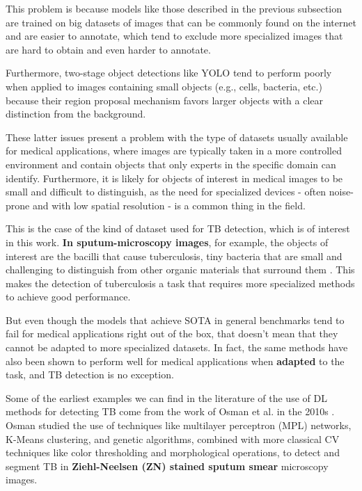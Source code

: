 \documentclass[../main.tex]{subfiles}
\begin{document}
    This problem is because models like those described in the previous subsection are trained on big datasets of images that can be commonly found on the internet and are easier to annotate, which tend to exclude more specialized images that are hard to obtain and even harder to annotate.

    Furthermore, two-stage object detections like YOLO tend to perform poorly when applied to images containing small objects (e.g., cells, bacteria, etc.)  because their region proposal mechanism favors larger objects with a clear distinction from the background. 

    These latter issues present a problem with the type of datasets usually available for medical applications, where images are typically taken in a more controlled environment and contain objects that only experts in the specific domain can identify. Furthermore, it is likely for objects of interest in medical images to be small and difficult to distinguish, as the need for specialized devices - often noise-prone and with low spatial resolution - is a common thing in the field.

    This is the case of the kind of dataset used for TB detection, which is of interest in this work. \textbf{In sputum-microscopy images}, for example, the objects of interest are the bacilli that cause tuberculosis, tiny bacteria that are small and challenging to distinguish from other organic materials that surround them \cite{osman_tuberculosis_2011}. This makes the detection of tuberculosis a task that requires more specialized methods to achieve good performance.

    But even though the models that achieve SOTA in general benchmarks tend to fail for medical applications right out of the box, that doesn't mean that they cannot be adapted to more specialized datasets. In fact, the same methods have also been shown to perform well for medical applications when \textbf{adapted} to the task, and TB detection is no exception.

    Some of the earliest examples we can find in the literature of the use of DL methods for detecting TB come from the work of Osman et al. in the 2010s \cite{osmanDetectionMycobacteriumTuberculosis2010,osman_tuberculosis_2011,ahmadGeneticAlgorithmArtificialNeural2010}. Osman studied the use of techniques like multilayer perceptron (MPL) networks, K-Means clustering, and genetic algorithms, combined with more classical CV techniques like color thresholding and morphological operations, to detect and segment TB in \textbf{Ziehl-Neelsen (ZN) stained sputum smear} microscopy images. 
\end{document}

